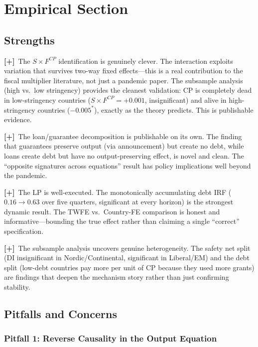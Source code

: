 \documentclass[12pt, a4paper]{article}
\newcommand{\strength}[1]{\textcolor{strength}{\textbf{[+]}~#1}}
\begin{document}
\section{Empirical Section}

\subsection{Strengths}

\strength{The $S \times F^{CP}$ identification is genuinely clever.} The interaction exploits variation that survives two-way fixed effects---this is a real contribution to the fiscal multiplier literature, not just a pandemic paper. The subsample analysis (high vs.\ low stringency) provides the cleanest validation: CP is completely dead in low-stringency countries ($S \times F^{CP} = +0.001$, insignificant) and alive in high-stringency countries ($-0.005^{*}$), exactly as the theory predicts. This is publishable evidence.

\strength{The loan/guarantee decomposition is publishable on its own.} The finding that guarantees preserve output (via announcement) but create no debt, while loans create debt but have no output-preserving effect, is novel and clean. The ``opposite signatures across equations'' result has policy implications well beyond the pandemic.

\strength{The LP is well-executed.} The monotonically accumulating debt IRF ($0.16 \to 0.63$ over five quarters, significant at every horizon) is the strongest dynamic result. The TWFE vs.\ Country-FE comparison is honest and informative---bounding the true effect rather than claiming a single ``correct'' specification.

\strength{The subsample analysis uncovers genuine heterogeneity.} The safety net split (DI insignificant in Nordic/Continental, significant in Liberal/EM) and the debt split (low-debt countries pay more per unit of CP because they used more grants) are findings that deepen the mechanism story rather than just confirming stability.


\subsection{Pitfalls and Concerns}

\subsubsection*{Pitfall 1: Reverse Causality in the Output Equation}
\end{document}
